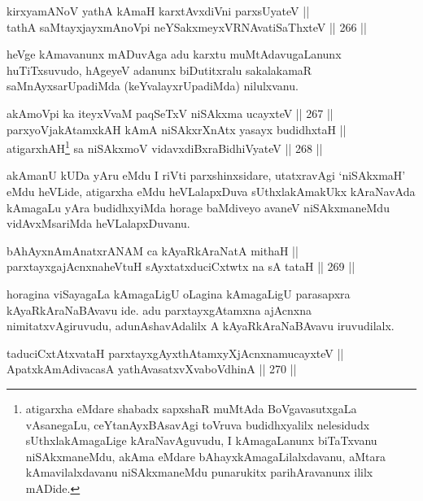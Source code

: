 \begin{shl}
kirxyamANoV yathA kAmaH karxtAvxdiVni parxsUyateV || \\
tathA saMtayxjayxmAnoV\s pi neYSakxmeyxVRNAvatiSaThxteV \hfill || 266 ||  
\end{shl}

\begin{artha}
heVge kAmavanunx mADuvAga adu karxtu muMtAdavugaLanunx huTiTxsuvudo,
hAgeyeV adanunx biDutitxralu sakalakamaR saMnAyxsarUpadiMda
(keYvalayxrUpadiMda) nilulxvanu.
\end{artha}


\begin{shl}
akAmoV\s pi ka iteyxVvaM paqSeTxV niSAkxma ucayxteV \hfill || 267 ||  \\
parxyoVjakAtamxkAH kAmA niSAkxrXnAtx yasayx budidhxtaH || \\
atigarxhAH\footnote{atigarxha eMdare shabadx sapxshaR muMtAda BoVgavasutxgaLa
vAsanegaLu, ceYtanAyxBAsavAgi toVruva budidhxyalilx nelesidudx
sUthxlakAmagaLige kAraNavAguvudu, I kAmagaLanunx biTaTxvanu
niSAkxmaneMdu, akAma eMdare bAhayxkAmagaLilalxdavanu, aMtara
kAmavilalxdavanu niSAkxmaneMdu punarukitx parihAravanunx ililx mADide.} sa niSAkxmoV vidavxdiBxraBidhiVyateV \hfill || 268 ||  
\end{shl}


\begin{artha}
akAmanU kUDa yAru eMdu I riVti parxshinxsidare, utatxravAgi
`niSAkxmaH' eMdu heVLide, atigarxha eMdu heVLalapxDuva sUthxlakAmakUkx
kAraNavAda kAmagaLu yAra budidhxyiMda horage baMdiveyo avaneV
niSAkxmaneMdu vidAvxMsariMda heVLalapxDuvanu.
\end{artha}

\begin{shl}
bAhAyxnAmAnatxrANAM ca kAyaRkAraNatA mithaH || \\
parxtayxgajAcnxnaheVtuH sAyxtatxduciCxtwtx na sA tataH \hfill || 269 ||  
\end{shl}

\begin{artha}
horagina viSayagaLa kAmagaLigU oLagina kAmagaLigU parasapxra
kAyaRkAraNaBAvavu ide. adu parxtayxgAtamxna ajAcnxna
nimitatxvAgiruvudu, adunAshavAdalilx A kAyaRkAraNaBAvavu iruvudilalx.
\end{artha}


\begin{shl}
taduciCxtAtxvataH parxtayxgAyxthAtamxyXjAcnxnamucayxteV || \\
ApatxkAmAdivacasA yathAvasatxvXvaboVdhinA \hfill || 270 ||  
\end{shl}

